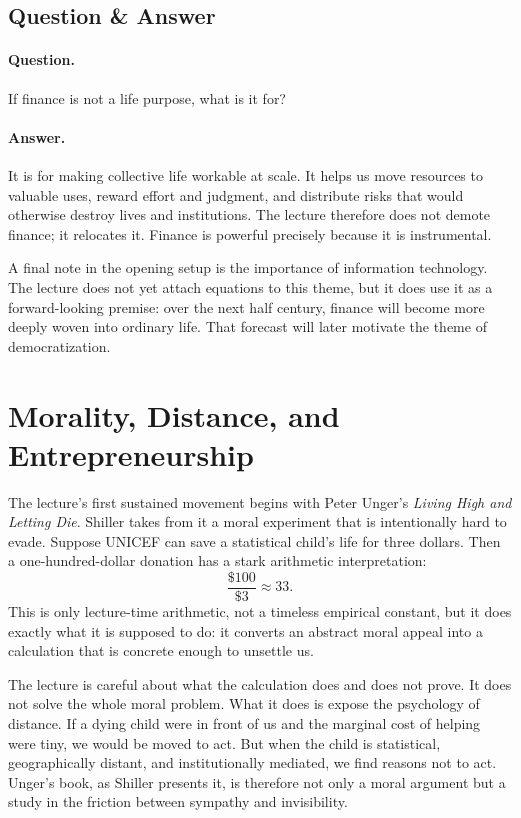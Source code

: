 \subsection{Question \& Answer}

\paragraph{Question.} If finance is not a life purpose, what is it for?

\paragraph{Answer.} It is for making collective life workable at scale. It helps us move resources to valuable uses, reward effort and judgment, and distribute risks that would otherwise destroy lives and institutions. The lecture therefore does not demote finance; it relocates it. Finance is powerful precisely because it is instrumental.

A final note in the opening setup is the importance of information technology. The lecture does not yet attach equations to this theme, but it does use it as a forward-looking premise: over the next half century, finance will become more deeply woven into ordinary life. That forecast will later motivate the theme of democratization.

\section{Morality, Distance, and Entrepreneurship}

The lecture's first sustained movement begins with Peter Unger's \emph{Living High and Letting Die}. Shiller takes from it a moral experiment that is intentionally hard to evade. Suppose UNICEF can save a statistical child's life for three dollars. Then a one-hundred-dollar donation has a stark arithmetic interpretation:
\begin{equation}
\frac{\$100}{\$3} \approx 33.
\end{equation}
This is only lecture-time arithmetic, not a timeless empirical constant, but it does exactly what it is supposed to do: it converts an abstract moral appeal into a calculation that is concrete enough to unsettle us.

The lecture is careful about what the calculation does and does not prove. It does not solve the whole moral problem. What it does is expose the psychology of distance. If a dying child were in front of us and the marginal cost of helping were tiny, we would be moved to act. But when the child is statistical, geographically distant, and institutionally mediated, we find reasons not to act. Unger's book, as Shiller presents it, is therefore not only a moral argument but a study in the friction between sympathy and invisibility.

